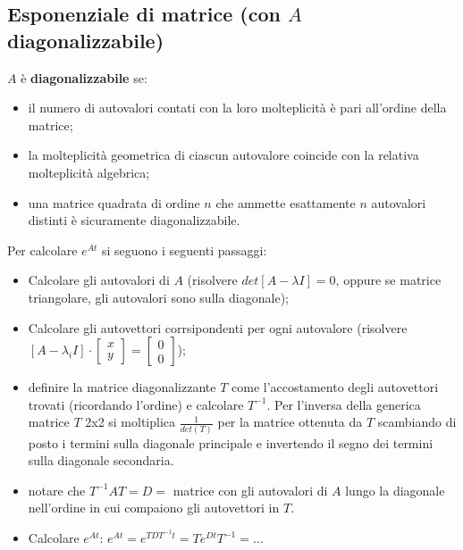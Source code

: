     \subsection{Esponenziale di matrice (con $A$ diagonalizzabile)}
    $A$ è \textbf{diagonalizzabile} se:
    \begin{itemize}
        \item il numero di autovalori contati con la loro molteplicità è pari all’ordine della matrice;
        \item la molteplicità geometrica di ciascun autovalore coincide con la relativa molteplicità algebrica;
        \item una matrice quadrata di ordine $n$ che ammette esattamente $n$ autovalori distinti è sicuramente diagonalizzabile.
    \end{itemize}
    Per calcolare $e^{At}$ si seguono i seguenti passaggi:
    \begin{itemize}
        \item Calcolare gli autovalori di $A$ (risolvere $det[A-\lambda I] = 0$, oppure se matrice triangolare, gli autovalori sono sulla diagonale);
        \item Calcolare gli autovettori corrsipondenti per ogni autovalore \newline (risolvere $[A-\lambda_i I] \cdot \left[\begin{matrix}
            x\\y
        \end{matrix}\right] = \left[\begin{matrix}
            0\\0
        \end{matrix}\right]$);
        \item definire la matrice diagonalizzante $T$ come l'accostamento degli autovettori trovati (ricordando l'ordine) e calcolare $T^{-1}$. Per l’inversa della generica matrice $T$ 2x2 si moltiplica $\frac{1}{det(T)}$ per la matrice ottenuta da $T$ scambiando di posto i termini sulla diagonale principale e invertendo
        il segno dei termini sulla diagonale secondaria.
        \item notare che $T^{-1} A T = D = $ matrice con gli autovalori di $A$ lungo la diagonale nell'ordine in cui compaiono gli autovettori in $T$.
        \item Calcolare $e^{At}$:\newline
        $e^{At} = e^{TDT^{-1} t} = T e^{Dt} T^{-1} = \dots$
    \end{itemize}
